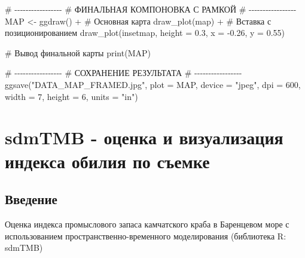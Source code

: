 \documentclass[
  letterpaper,
  DIV=11,
  numbers=noendperiod]{scrreprt}
\newenvironment{Shaded}{\begin{snugshade}}{\end{snugshade}}
\newcommand{\AttributeTok}[1]{\textcolor[rgb]{0.40,0.45,0.13}{#1}}
\newcommand{\CommentTok}[1]{\textcolor[rgb]{0.37,0.37,0.37}{#1}}
\newcommand{\DecValTok}[1]{\textcolor[rgb]{0.68,0.00,0.00}{#1}}
\newcommand{\FloatTok}[1]{\textcolor[rgb]{0.68,0.00,0.00}{#1}}
\newcommand{\FunctionTok}[1]{\textcolor[rgb]{0.28,0.35,0.67}{#1}}
\newcommand{\NormalTok}[1]{\textcolor[rgb]{0.00,0.23,0.31}{#1}}
\newcommand{\OtherTok}[1]{\textcolor[rgb]{0.00,0.23,0.31}{#1}}
\newcommand{\SpecialCharTok}[1]{\textcolor[rgb]{0.37,0.37,0.37}{#1}}
\newcommand{\StringTok}[1]{\textcolor[rgb]{0.13,0.47,0.30}{#1}}
\begin{document}
\begin{Shaded}
\begin{Highlighting}[]
\CommentTok{\# {-}{-}{-}{-}{-}{-}{-}{-}{-}{-}{-}{-}{-}{-}{-}{-}{-}}
\CommentTok{\# ФИНАЛЬНАЯ КОМПОНОВКА С РАМКОЙ}
\CommentTok{\# {-}{-}{-}{-}{-}{-}{-}{-}{-}{-}{-}{-}{-}{-}{-}{-}{-}}
\NormalTok{MAP }\OtherTok{\textless{}{-}} \FunctionTok{ggdraw}\NormalTok{() }\SpecialCharTok{+}
  \CommentTok{\# Основная карта}
  \FunctionTok{draw\_plot}\NormalTok{(map) }\SpecialCharTok{+}
  \CommentTok{\# Вставка с позиционированием}
  \FunctionTok{draw\_plot}\NormalTok{(insetmap,}
            \AttributeTok{height =} \FloatTok{0.3}\NormalTok{,}
            \AttributeTok{x =} \SpecialCharTok{{-}}\FloatTok{0.26}\NormalTok{,}
            \AttributeTok{y =} \FloatTok{0.55}\NormalTok{) }

\CommentTok{\# Вывод финальной карты}
\FunctionTok{print}\NormalTok{(MAP)}

\CommentTok{\# {-}{-}{-}{-}{-}{-}{-}{-}{-}{-}{-}{-}{-}{-}{-}{-}{-}}
\CommentTok{\# СОХРАНЕНИЕ РЕЗУЛЬТАТА}
\CommentTok{\# {-}{-}{-}{-}{-}{-}{-}{-}{-}{-}{-}{-}{-}{-}{-}{-}{-}}
\FunctionTok{ggsave}\NormalTok{(}\StringTok{"DATA\_MAP\_FRAMED.jpg"}\NormalTok{, }
       \AttributeTok{plot =}\NormalTok{ MAP,}
       \AttributeTok{device =} \StringTok{"jpeg"}\NormalTok{, }
       \AttributeTok{dpi =} \DecValTok{600}\NormalTok{,}
       \AttributeTok{width =} \DecValTok{7}\NormalTok{,}
       \AttributeTok{height =} \DecValTok{6}\NormalTok{,}
       \AttributeTok{units =} \StringTok{"in"}\NormalTok{)}
\end{Highlighting}
\end{Shaded}


\chapter{sdmTMB - оценка и визуализация индекса обилия по
съемке}\label{sdmtmb---ux43eux446ux435ux43dux43aux430-ux438-ux432ux438ux437ux443ux430ux43bux438ux437ux430ux446ux438ux44f-ux438ux43dux434ux435ux43aux441ux430-ux43eux431ux438ux43bux438ux44f-ux43fux43e-ux441ux44aux435ux43cux43aux435}

\section{Введение}\label{ux432ux432ux435ux434ux435ux43dux438ux435-3}

Оценка индекса промыслового запаса камчатского краба в Баренцевом море с
использованием пространственно-временного моделирования (библиотека R:
sdmTMB)
\end{document}
